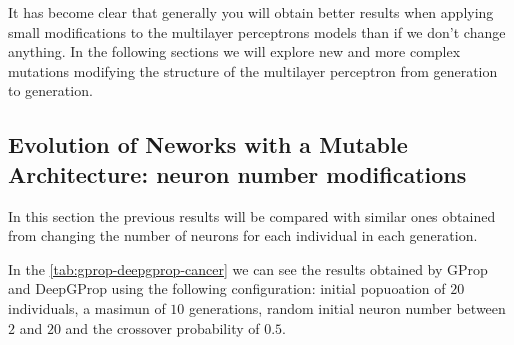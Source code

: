 \documentclass[runningheads]{llncs}
\begin{document}
It has become clear that generally you will obtain better results when applying
small modifications to the multilayer perceptrons models than if we don't
change anything. In the following sections we will explore new and more complex
mutations modifying the structure of the multilayer perceptron from generation
to generation.


\subsection{Evolution of Neworks with a Mutable Architecture: neuron number modifications}


In this section the previous results will be compared with similar ones
obtained from changing the number of neurons for each individual in each
generation.


In the \autoref{tab:gprop-deepgprop-cancer} we can see the results obtained by
GProp and DeepGProp using the following configuration: initial popuoation of
$20$ individuals, a masimun of $10$ generations, random initial neuron number
between $2$ and $20$ and the crossover probability of $0.5$.
\end{document}
